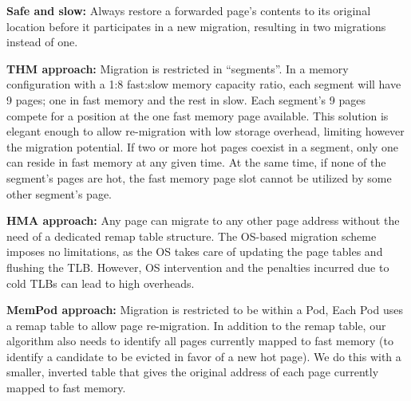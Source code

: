 {	\textbf{Safe and slow:} Always restore a forwarded page's contents to its original location before it participates in a new migration, resulting in two migrations instead of one. %
}

	\textbf{THM approach:} Migration is restricted in ``segments''. In a memory configuration with a 1:8 fast:slow memory capacity ratio, each segment will have 9 pages; one in fast memory and the rest in slow. Each segment's 9 pages compete for a position at the one fast memory page available. This solution is elegant enough to allow re-migration with low storage overhead, limiting however the migration potential. If two or more hot pages coexist in a segment, only one can reside in fast memory at any given time. At the same time, if none of the segment's pages are hot, the fast memory page slot cannot be utilized by some other segment's page. %

	\textbf{HMA approach:} Any page can migrate to any other page address without the need of a dedicated remap table structure. The OS-based migration scheme imposes no limitations, as the OS takes care of updating the page tables and flushing the TLB. However, OS intervention and the penalties incurred due to cold TLBs can lead to high overheads.
	
	\textbf{MemPod approach:} Migration is restricted to be within a Pod,
Each Pod uses a remap table to allow page re-migration.  In addition to the
remap table, our algorithm also needs to identify all pages currently 
mapped to fast memory (to identify a candidate to be evicted in favor of a
new hot page).  We do this with a smaller, inverted table that gives the 
original address of each page currently mapped to fast memory.
 
